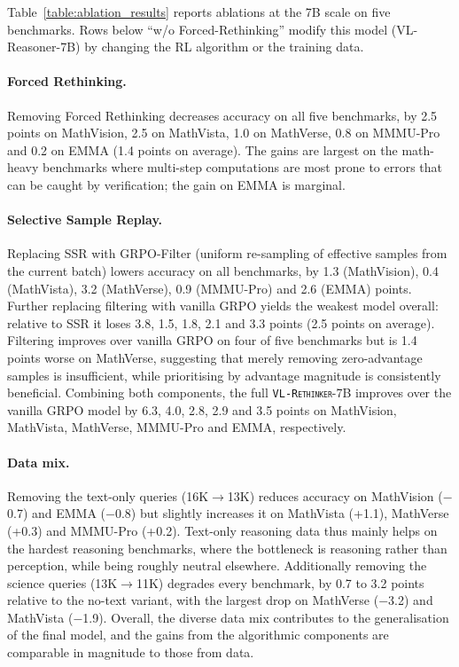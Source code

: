 \documentclass{article}
\newcommand{\model}{\texttt{\textsc{VL-Rethinker}}\xspace}
\begin{document}
Table~\ref{table:ablation_results} reports ablations at the 7B scale on five benchmarks. Rows below ``w/o Forced-Rethinking'' modify this model (VL-Reasoner-7B) by changing the RL algorithm or the training data.

\paragraph{Forced Rethinking.} Removing Forced Rethinking decreases accuracy on all five benchmarks, by 2.5 points on MathVision, 2.5 on MathVista, 1.0 on MathVerse, 0.8 on MMMU-Pro and 0.2 on EMMA (1.4 points on average). The gains are largest on the math-heavy benchmarks where multi-step computations are most prone to errors that can be caught by verification; the gain on EMMA is marginal.

\paragraph{Selective Sample Replay.} Replacing SSR with GRPO-Filter (uniform re-sampling of effective samples from the current batch) lowers accuracy on all benchmarks, by 1.3 (MathVision), 0.4 (MathVista), 3.2 (MathVerse), 0.9 (MMMU-Pro) and 2.6 (EMMA) points. Further replacing filtering with vanilla GRPO yields the weakest model overall: relative to SSR it loses 3.8, 1.5, 1.8, 2.1 and 3.3 points (2.5 points on average). Filtering improves over vanilla GRPO on four of five benchmarks but is 1.4 points worse on MathVerse, suggesting that merely removing zero-advantage samples is insufficient, while prioritising by advantage magnitude is consistently beneficial. Combining both components, the full \model-7B improves over the vanilla GRPO model by 6.3, 4.0, 2.8, 2.9 and 3.5 points on MathVision, MathVista, MathVerse, MMMU-Pro and EMMA, respectively.

\paragraph{Data mix.} Removing the text-only queries (16K$\rightarrow$13K) reduces accuracy on MathVision ($-$0.7) and EMMA ($-$0.8) but slightly increases it on MathVista (+1.1), MathVerse (+0.3) and MMMU-Pro (+0.2). Text-only reasoning data thus mainly helps on the hardest reasoning benchmarks, where the bottleneck is reasoning rather than perception, while being roughly neutral elsewhere. Additionally removing the science queries (13K$\rightarrow$11K) degrades every benchmark, by 0.7 to 3.2 points relative to the no-text variant, with the largest drop on MathVerse ($-$3.2) and MathVista ($-$1.9). Overall, the diverse data mix contributes to the generalisation of the final model, and the gains from the algorithmic components are comparable in magnitude to those from data.
\end{document}

